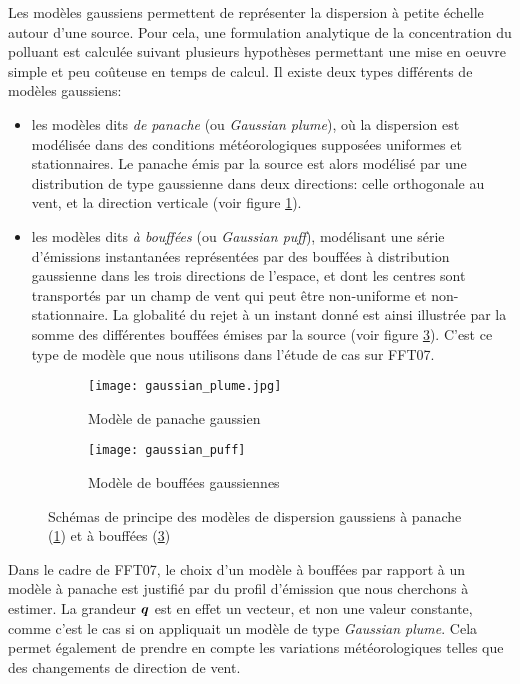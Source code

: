Les modèles gaussiens permettent de représenter la dispersion à petite échelle autour d'une source. Pour cela, une formulation analytique de la concentration du polluant est calculée suivant plusieurs hypothèses permettant une mise en oeuvre simple et peu coûteuse en temps de calcul. Il existe deux types différents de modèles gaussiens:\\

\begin{itemize}
	\item les modèles dits \textit{de panache} (ou \textit{Gaussian plume}), où la dispersion est modélisée dans des conditions météorologiques supposées uniformes et stationnaires. Le panache émis par la source est alors modélisé par une distribution de type gaussienne dans deux directions: celle orthogonale au vent, et la direction verticale (voir figure \ref{gaussian_plume}).
	\item les modèles dits \textit{à bouffées} (ou \textit{Gaussian puff}), modélisant une série d'émissions instantanées représentées par des bouffées à distribution gaussienne dans les trois directions de l'espace, et dont les centres sont transportés par un champ de vent qui peut  être non-uniforme et non-stationnaire. La globalité du rejet à un instant donné est ainsi illustrée par la somme des différentes bouffées émises par la source (voir figure \ref{gaussian_puff}). C'est ce type de modèle que nous utilisons dans l'étude de cas sur FFT07.
\end{itemize}

 \begin{figure}[h!]
 	\label{fig_gaussian_models}	
 	\centering
 	\begin{subfigure}[t]{0.5\textwidth}
 		\centering
 		\texttt{[image: gaussian\_plume.jpg]}
 		\caption{Modèle de panache gaussien \cite{Schulze1996}}
 		\label{gaussian_plume}
 	\end{subfigure}%
 	\begin{subfigure}[t]{0.5\textwidth}
 		\centering
 		\texttt{[image: gaussian\_puff]}
 		\caption{Modèle de bouffées gaussiennes}
 		\label{gaussian_puff}
 	\end{subfigure}
 	
 	\caption{Schémas de principe des modèles de dispersion gaussiens à panache (\ref{gaussian_plume}) et à bouffées (\ref{gaussian_puff})}
 \end{figure}
 
 Dans le cadre de FFT07, le choix d'un modèle à bouffées par rapport à un modèle à panache est justifié par  du profil d'émission que nous cherchons à estimer. La grandeur ${\bm{q}}$ est en effet un vecteur, et non une valeur constante, comme c'est le cas si on appliquait un modèle de type \textit{Gaussian plume}. Cela permet également de prendre en compte les variations météorologiques telles que des changements de direction de vent. \\
 
